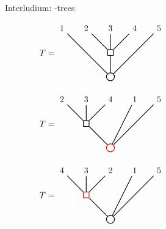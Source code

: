 \begin{frame}{Interludium: \PQ-trees}

\begin{overprint}
$\hspace{4em}T = 
\begin{aligned}
\begin{tikzpicture}

\tikzstyle{every path}+=[thick]

\node (1) {1};
\node[right of=1] (2) {2};
\node[right of=2] (3) {3};
\node[right of=3] (4) {4};
\node[right of=4] (5) {5};

\node[rectangle, draw, below of=3] (t2) {};
\node[circle, draw, below of=t2] (t1) {};

\draw (t1) edge (1);
\draw (t1) edge (5);
\draw (t2) edge (2);
\draw (t2) edge (3);
\draw (t2) edge (4);
\draw (t1) edge (t2);
\end{tikzpicture}
\end{aligned}$

$\hspace{4em}T = 
\begin{aligned}
\begin{tikzpicture}

\tikzstyle{every path}+=[thick]

\node (2) {2};
\node[right of=2] (3) {3};
\node[right of=3] (4) {4};
\node[right of=4] (1) {1};
\node[right of=1] (5) {5};

\node[rectangle, draw, below of=3] (t2) {};
\node[circle, draw, below of=t2,right of=t2,red] (t1) {};

\draw (t1) edge (1);
\draw (t1) edge (5);
\draw (t2) edge (2);
\draw (t2) edge (3);
\draw (t2) edge (4);
\draw (t1) edge (t2);
\end{tikzpicture}
\end{aligned}$

$\hspace{4em}T = 
\begin{aligned}
\begin{tikzpicture}

\tikzstyle{every path}+=[thick]

\node (4) {4};
\node[right of=4] (3) {3};
\node[right of=3] (2) {2};
\node[right of=2] (1) {1};
\node[right of=1] (5) {5};

\node[rectangle, draw, below of=3,red] (t2) {};
\node[circle, draw, below of=t2,right of=t2] (t1) {};

\draw (t1) edge (1);
\draw (t1) edge (5);
\draw (t2) edge (2);
\draw (t2) edge (3);
\draw (t2) edge (4);
\draw (t1) edge (t2);
\end{tikzpicture}
\end{aligned}$


\end{overprint}
\end{frame}
